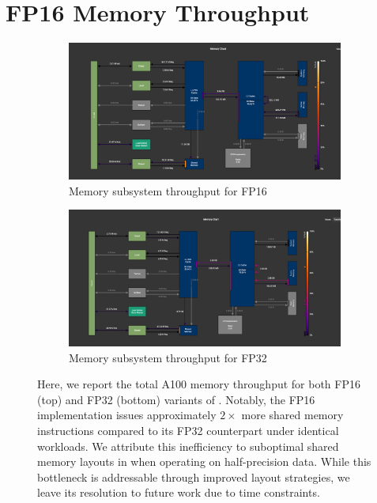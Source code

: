 \section{FP16 Memory Throughput}\label{sec:fp16-memory-throughput}
\begin{figure}[!ht]
    \centering
    \begin{subfigure}{\textwidth}
        \centering
        \includegraphics[width=0.8\linewidth, keepaspectratio]{figures/fp16_t}
        \caption{Memory subsystem throughput for FP16}
        \label{sub:fp16}
    \end{subfigure}
    \hfill
    \begin{subfigure}{\textwidth}
        \centering
        \includegraphics[width=0.8\linewidth, keepaspectratio]{figures/fp32_t}
        \caption{Memory subsystem throughput for FP32}
        \label{sub:fp32}
    \end{subfigure}
    \caption{Here, we report the total A100 memory throughput for both FP16 (top) and FP32 (bottom) variants of \sysname.
    Notably, the FP16 implementation issues approximately $2\times$
        more shared memory instructions compared to its FP32 counterpart
        under identical workloads.
        We attribute this inefficiency to
        suboptimal shared memory layouts in \sysname when
        operating on half-precision data.
        While this bottleneck is addressable through improved layout strategies,
        we leave its resolution to future work due to time constraints.}
    \label{fig:mem_t}
\end{figure}